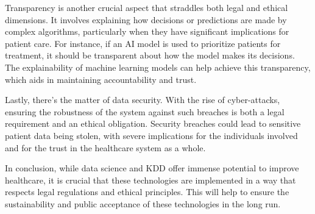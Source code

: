 Transparency is another crucial aspect that straddles both legal and ethical dimensions. It involves explaining how decisions or predictions are made by complex algorithms, particularly when they have significant implications for patient care. For instance, if an AI model is used to prioritize patients for treatment, it should be transparent about how the model makes its decisions. The explainability of machine learning models can help achieve this transparency, which aids in maintaining accountability and trust.

Lastly, there's the matter of data security. With the rise of cyber-attacks, ensuring the robustness of the system against such breaches is both a legal requirement and an ethical obligation. Security breaches could lead to sensitive patient data being stolen, with severe implications for the individuals involved and for the trust in the healthcare system as a whole.

In conclusion, while data science and KDD offer immense potential to improve healthcare, it is crucial that these technologies are implemented in a way that respects legal regulations and ethical principles. This will help to ensure the sustainability and public acceptance of these technologies in the long run.